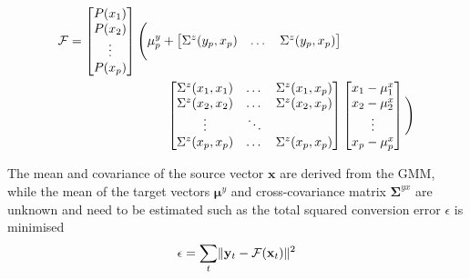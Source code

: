 \begin{equation}
	\begin{split}
		\mathcal F=\begin{bmatrix}
			P(x_1) \\
			P(x_2) \\
			\vdots \\
			P(x_p) \\
		\end{bmatrix}\Bigg(
			\mu_p^y + 
		\begin{bmatrix}
			\Sigma^z(y_p,x_p) & \dots & \Sigma^z(y_p,x_p)\\
		\end{bmatrix} & \\
		\begin{bmatrix}
			\Sigma^z(x_1,x_1) & \dots & \Sigma^z(x_1,x_p) \\
			\Sigma^z(x_2,x_2) & \dots & \Sigma^z(x_2,x_p)\\
			\vdots & \ddots & \\
			\Sigma^z(x_p,x_p) & \dots & \Sigma^z(x_p,x_p)\\
		\end{bmatrix} &
		\begin{bmatrix}
			x_1 - \mu_1^x \\
			x_2 - \mu_2^x \\
			\vdots \\
			x_p - \mu_p^x \\
		\end{bmatrix}\Bigg)
	\end{split}
\end{equation}

The mean and covariance of the source vector $\mathbf{x}$ are derived from the GMM, while the mean of the target vectors $\boldsymbol{\mu}^y$ and cross-covariance matrix $\mathbf{\Sigma}^{yx}$ are unknown and need to be estimated such as the total squared conversion error $\epsilon$ is minimised
\begin{equation}
	\label{eq:conversion_error}
	\epsilon = \sum_{t} \lVert\mathbf{y}_t - \mathcal{F}(\mathbf{x}_t)\rVert^2
\end{equation}

